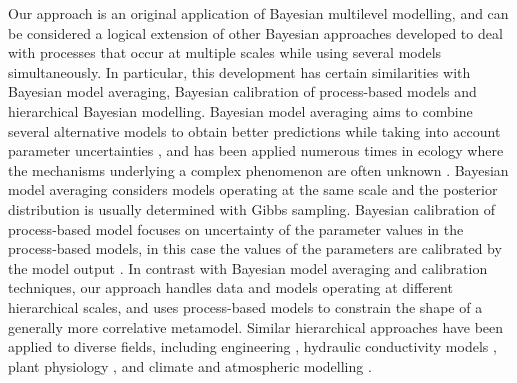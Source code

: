 Our approach is an original application of Bayesian multilevel modelling, and can be considered a logical extension of other Bayesian approaches developed to deal with processes that occur at multiple scales while using several models simultaneously. 
In particular, this development has certain similarities with Bayesian model averaging, Bayesian calibration of process-based models and hierarchical Bayesian modelling. 
Bayesian model averaging aims to combine several alternative models to obtain better predictions while taking into account parameter uncertainties \citep{Hoeting1999}, and has been applied numerous times in ecology where the mechanisms underlying a complex phenomenon are often unknown \citep[e.g.][]{Wintle2003, Link2006}. 
Bayesian model averaging considers models operating at the same scale and the posterior distribution is usually determined with Gibbs sampling. 
Bayesian calibration of process-based model focuses on uncertainty of the parameter values in the process-based models, in this case the values of the parameters are calibrated by the model output \citep{VanOijen2005, VanOijen2011}. 
In contrast with Bayesian model averaging and calibration techniques, our approach handles data and models operating at different hierarchical scales, and uses process-based models to constrain the shape of a generally more correlative metamodel.
Similar hierarchical approaches have been applied to diverse fields, including engineering \citep{Booth2013}, hydraulic conductivity models \citep{Dostert2009, Efendiev2005, Efendiev2005a}, plant physiology \citep{Ogle2008, Ogle2009}, and climate and atmospheric modelling \citep{Zimmerman2005, Mcmillan2010, Kang2012}.

